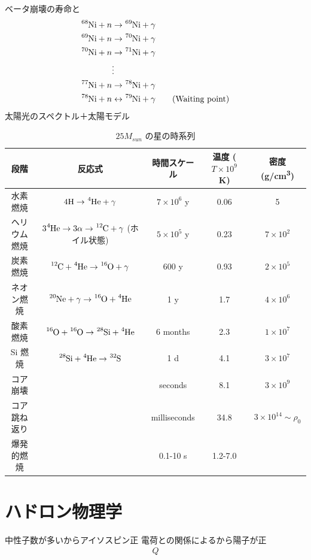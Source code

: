 \documentclass[uplatex,dvipdfmx,a4paper,11pt]{jlreq}
\numberwithin{equation}{section}
\theoremstyle{definition}
\begin{document}
ベータ崩壊の寿命と
\begin{align}
  \ce{^68Ni} + n & \to \ce{^69Ni} + \gamma                                             \\
  \ce{^69Ni} + n & \to \ce{^70Ni} + \gamma                                             \\
  \ce{^70Ni} + n & \to \ce{^71Ni} + \gamma                                             \\
                 & \vdots                                                              \\
  \ce{^77Ni} + n & \to \ce{^78Ni} + \gamma                                             \\
  \ce{^78Ni} + n & \leftrightarrow \ce{^79Ni} + \gamma \qquad (\textrm{Waiting point})
\end{align}
太陽光のスペクトル＋太陽モデル

\begin{table}[hbtp]
  \centering
  \begin{tabular}{|c|c|c|c|c|}
    \hline
    段階     & 反応式                                                     & 時間スケール           & 温度 ($T\times 10^9$ \si{K}) & 密度 (\si{g/cm^3})            \\
    \hline \hline
    水素燃焼   & $4\ce{H} \to \ce{^4He} + \gamma$                        & $7\times 10^6$ y & 0.06                       & 5                           \\
    ヘリウム燃焼 & $3\ce{^4He} \to 3\alpha \to \ce{^12C} + \gamma$ (ホイル状態) & $5\times 10^5$ y & 0.23                       & $7\times 10^2$              \\
    炭素燃焼   & $\ce{^12C} + \ce{^4He} \to \ce{^16O} + \gamma$          & 600 y            & 0.93                       & $2\times 10^5$              \\
    ネオン燃焼  & $\ce{^20Ne} + \gamma \to \ce{^16O} + \ce{^4He}$         & 1 y              & 1.7                        & $4\times 10^6$              \\
    酸素燃焼   & $\ce{^16O} + \ce{^16O}\to\ce{^28Si} + \ce{^4He}$        & 6 months         & 2.3                        & $1\times 10^7$              \\
    Si 燃焼  & $\ce{^28Si} + \ce{^4He}\to\ce{^32S}$                    & 1 d              & 4.1                        & $3\times 10^7$              \\
    コア崩壊   &                                                         & seconds          & 8.1                        & $3\times 10^9$              \\
    コア跳ね返り &                                                         & milliseconds     & 34.8                       & $3\times 10^{14}\sim\rho_0$ \\
    爆発的燃焼  &                                                         & 0.1-10 s         & 1.2-7.0                    &                             \\
    \hline
  \end{tabular}
  \caption{$25M_{sun}$ の星の時系列}
  \label{table:star}
\end{table}

\section{ハドロン物理学}
中性子数が多いからアイソスピン正
電荷との関係によるから陽子が正
\begin{align}
  Q
\end{align}
\end{document}
